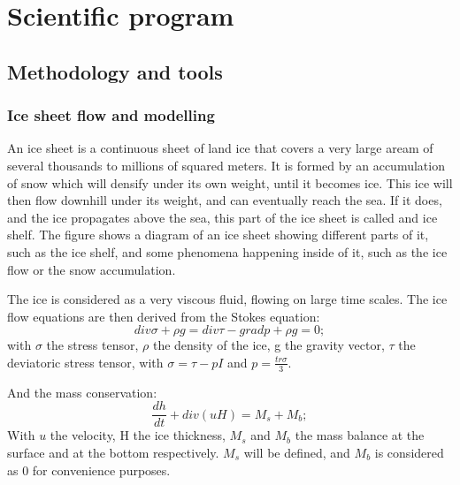 \documentclass[a4paper,12pt]{article}
\begin{document}
\section{Scientific program}
\subsection{Methodology and tools}
\subsubsection{Ice sheet flow and modelling}
An ice sheet is a continuous sheet of land ice that covers a very large aream of several thousands to millions of squared meters. It is formed by an accumulation of snow which will densify under its own weight, until it becomes ice. This ice will then flow downhill under its weight, and can eventually reach the sea. If it does, and the ice propagates above the sea, this part of the ice sheet is called and ice shelf. The figure shows a diagram of an ice sheet showing different parts of it, such as the ice shelf, and some phenomena happening inside of it, such as the ice flow or the snow accumulation.

The ice is considered as a very viscous fluid, flowing on large time scales. The ice flow equations are then derived from the Stokes equation:
\begin{equation}
	div\sigma + \rho g = div\tau - gradp + \rho g = 0;
\end{equation}
with $\sigma$ the stress tensor, $\rho$ the density of the ice, g the gravity vector, $\tau$ the deviatoric stress tensor, with $\sigma = \tau - pI$ and $p=\frac{tr\sigma}{3}$. 

And the mass conservation:
\begin{equation}
	\frac{dh}{dt}+ div(uH)=M_s + M_b;
\end{equation}
With $u$ the velocity, H the ice thickness, $M_s$ and $M_b$ the mass balance at the surface and at the bottom respectively. $M_s$ will be defined, and $M_b$ is considered as 0 for convenience purposes. 
\end{document}
